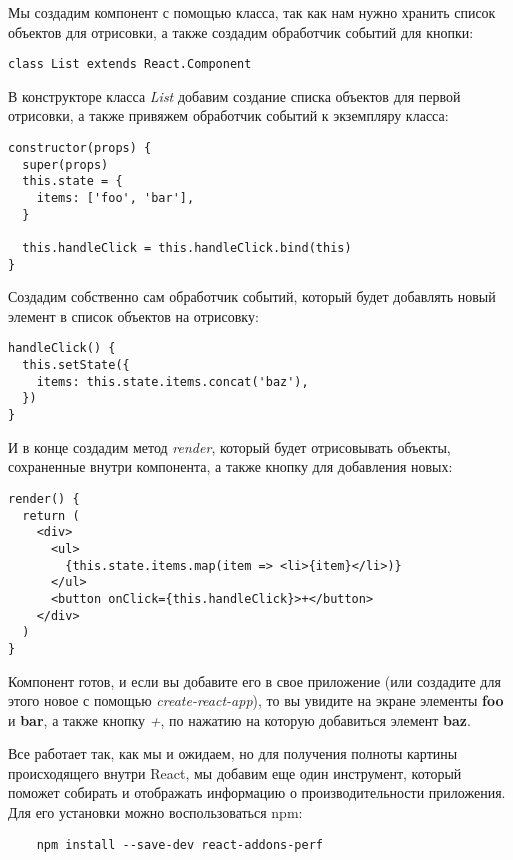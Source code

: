 Мы создадим компонент с помощью класса, так как нам нужно хранить список объектов для отрисовки, а также создадим обработчик событий для кнопки:

\begin{lstlisting}
class List extends React.Component
\end{lstlisting}

В конструкторе класса \textit{List} добавим создание списка объектов для первой отрисовки, а также привяжем обработчик событий к экземпляру класса:

\begin{lstlisting}
constructor(props) {
  super(props)
  this.state = {
    items: ['foo', 'bar'],
  }

  this.handleClick = this.handleClick.bind(this)
}
\end{lstlisting}

Создадим собственно сам обработчик событий, который будет добавлять новый элемент в список объектов на отрисовку:

\begin{lstlisting}
handleClick() {
  this.setState({
    items: this.state.items.concat('baz'),
  })
}
\end{lstlisting}

И в конце создадим метод \textit{render}, который будет отрисовывать объекты, сохраненные внутри компонента, а также кнопку для добавления новых:

\begin{lstlisting}
render() {
  return (
    <div>
      <ul>
        {this.state.items.map(item => <li>{item}</li>)}
      </ul>
      <button onClick={this.handleClick}>+</button>
    </div>
  )
}	
\end{lstlisting}

Компонент готов, и если вы добавите его в свое приложение (или создадите для этого новое с помощью \textit{create-react-app}), то вы увидите на экране элементы \textbf{foo} и \textbf{bar}, а также кнопку \textit{+}, по нажатию на которую добавиться элемент \textbf{baz}. 

Все работает так, как мы и ожидаем, но для получения полноты картины происходящего внутри React, мы добавим еще один инструмент, который поможет собирать и отображать информацию о производительности приложения. Для его установки можно воспользоваться npm:

\begin{lstlisting}
	npm install --save-dev react-addons-perf
\end{lstlisting}

